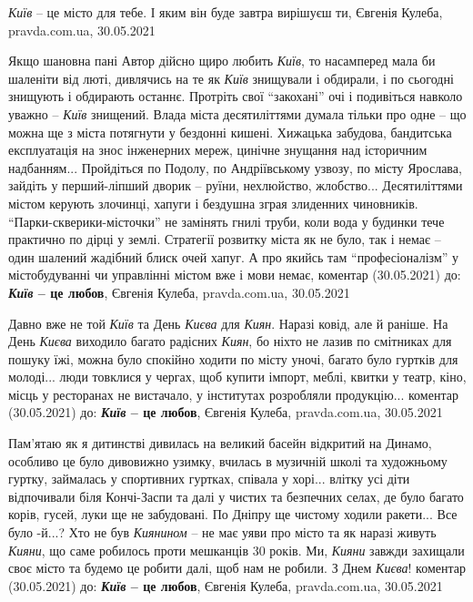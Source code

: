 \emph{Київ} – це місто для тебе. І яким він буде завтра вирішуєш ти, Євгенія
Кулеба, pravda.com.ua, 30.05.2021

Якщо шановна пані Автор дійсно щиро любить \emph{Київ}, то насамперед мала би
шаленіти від люті, дивлячись на те як \emph{Київ} знищували і обдирали, і по
сьогодні знищують і обдирають останнє. Протріть свої \enquote{закохані} очі і
подивіться навколо уважно – \emph{Київ} знищений. Влада міста десятиліттями
думала тільки про одне – що можна ще з міста потягнути у бездонні кишені.
Хижацька забудова, бандитська експлуатація на знос інженерних мереж, цинічне
знущання над історичним надбанням...  Пройдіться по Подолу, по Андріївському
узвозу, по місту Ярослава, зайдіть у перший-ліпший дворик – руїни, нехлюйство,
жлобство... Десятиліттями містом керують злочинці, хапуги і бездушна зграя
злиденних чиновників.  \enquote{Парки-скверики-місточки} не замінять гнилі
труби, коли вода у будинки тече практично по дірці у землі. Стратегії розвитку
міста як не було, так і немає – один шалений жадібний блиск очей хапуг. А про
якийсь там \enquote{професіоналізм} у містобудуванні чи управлінні містом вже і
мови немає,
коментар (30.05.2021) до: \textbf{\emph{Київ} – це любов}, Євгенія Кулеба, pravda.com.ua, 30.05.2021

Давно вже не той \emph{Київ} та День \emph{Києва} для \emph{Киян}. Наразі ковід, але й раніше.  На
День \emph{Києва} виходило багато радісних \emph{Киян}, бо ніхто не лазив по смітниках для
пошуку їжі, можна було спокійно ходити по місту уночі, багато було гуртків для
молоді... люди товклися у чергах, щоб купити імпорт, меблі, квитки у театр,
кіно, місць у ресторанах не вистачало, у інститутах розробляли продукцію...
коментар (30.05.2021) до: \textbf{\emph{Київ} – це любов}, Євгенія Кулеба, pravda.com.ua, 30.05.2021

Пам'ятаю як я дитинстві дивилась на великий басейн відкритий на Динамо,
особливо це було дивовижно узимку, вчилась в музичній школі та художньому гуртку,
займалась у спортивних гуртках, співала у хорі... влітку усі діти відпочивали біля Кончі-Заспи та далі у чистих та безпечних селах, де було багато корів, гусей, луки ще не забудовані.
По Дніпру ще чистому ходили ракети...
Все було -й...? Хто не був \emph{Киянином} – не має уяви про місто та як наразі живуть \emph{Кияни},
що саме робилось проти мешканців 30 років.
Ми, \emph{Кияни} завжди захищали своє місто та будемо це робити далі,
щоб нам не робили.
З Днем \emph{Києва}!
коментар (30.05.2021) до: \textbf{\emph{Київ} – це любов}, Євгенія Кулеба, pravda.com.ua, 30.05.2021

